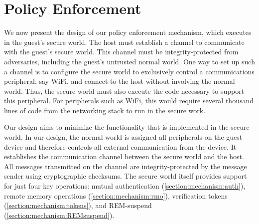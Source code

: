 \documentclass[pageno]{sig-alternate-05-2015}
\newcommand{\mysection}[1]{\section{#1}}
\newcommand{\sectref}[1]{\autoref{#1}}
\begin{document}
% 

\mysection{Policy Enforcement}
\label{section:mechanism}

We now present the design of our policy enforcement mechanism, which executes
in the guest's secure world. The host must establish a channel to communicate
with the guest's secure world. This channel must be integrity-protected from
adversaries, including the guest's untrusted normal world.  One way to set up
such a channel is to configure the secure world to exclusively control a
communications peripheral, say WiFi, and connect to the host without involving
the normal world. Thus, the secure world must also execute the code necessary
to support this peripheral. For peripherals such as WiFi, this would require
several thousand lines of code from the networking stack to run in the secure
work.

Our design aims to minimize the functionality that is implemented in the secure
world.  In our design, the normal world is assigned all peripherals on the
guest device and therefore controls all external communication from the device.
It establishes the communication channel between the secure world and the host.
All messages transmitted on the channel are integrity-protected by the message
sender using cryptographic checksums. The secure world itself provides support
for just four key operations:
%
mutual authentication (\sectref{section:mechanism:auth}), 
%
remote memory operations (\sectref{section:mechanism:rmo}),
%
verification tokens (\sectref{section:mechanism:tokens}), and
%
REM-suspend (\sectref{section:mechanism:REMsuspend}).
\end{document}
